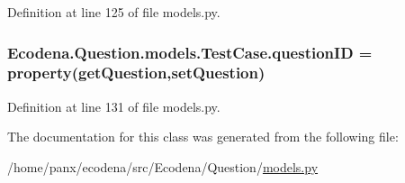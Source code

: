 Definition at line 125 of file models.py.

\hypertarget{class_ecodena_1_1_question_1_1models_1_1_test_case_a736b919e7fbdde24e0aa823bd3ed4431}{
\subsubsection[{questionID}]{\setlength{\rightskip}{0pt plus 5cm}Ecodena.Question.models.TestCase.questionID = property(getQuestion,setQuestion)}}
\label{d4/d96/class_ecodena_1_1_question_1_1models_1_1_test_case_a736b919e7fbdde24e0aa823bd3ed4431}


Definition at line 131 of file models.py.



The documentation for this class was generated from the following file:\begin{DoxyCompactItemize}
\item 
/home/panx/ecodena/src/Ecodena/Question/\hyperlink{_question_2models_8py}{models.py}\end{DoxyCompactItemize}
